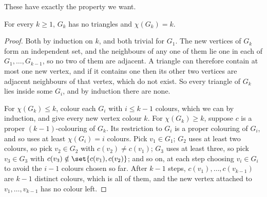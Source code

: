 \begin{figure}[H]
    \centering
\end{figure}

These have exactly the property we want.

\begin{boxproposition} \label{Ch2:Prop:Zykov}
    For every $k \geq 1$, $G_k$ has no triangles and $\chi(G_k) = k$.
\end{boxproposition}
\begin{proof}
    Both by induction on $k$, and both trivial for $G_1$. The new vertices of $G_k$ form an independent set, and the neighbours of any one of them lie one in each of $G_1, \ldots, G_{k-1}$, so no two of them are adjacent. A triangle can therefore contain at most one new vertex, and if it contains one then its other two vertices are adjacent neighbours of that vertex, which do not exist. So every triangle of $G_k$ lies inside some $G_i$, and by induction there are none.

    For $\chi(G_k) \leq k$, colour each $G_i$ with $i \leq k - 1$ colours, which we can by induction, and give every new vertex colour $k$. For $\chi(G_k) \geq k$, suppose $c$ is a proper $(k-1)$-colouring of $G_k$. Its restriction to $G_i$ is a proper colouring of $G_i$, and so uses at least $\chi(G_i) = i$ colours. Pick $v_1 \in G_1$; $G_2$ uses at least two colours, so pick $v_2 \in G_2$ with $c(v_2) \neq c(v_1)$; $G_3$ uses at least three, so pick $v_3 \in G_3$ with $c(v_3) \notin \set{c(v_1), c(v_2)}$; and so on, at each step choosing $v_i \in G_i$ to avoid the $i - 1$ colours chosen so far. After $k - 1$ steps, $c(v_1), \ldots, c(v_{k-1})$ are $k - 1$ distinct colours, which is all of them, and the new vertex attached to $v_1, \ldots, v_{k-1}$ has no colour left.
\end{proof}


